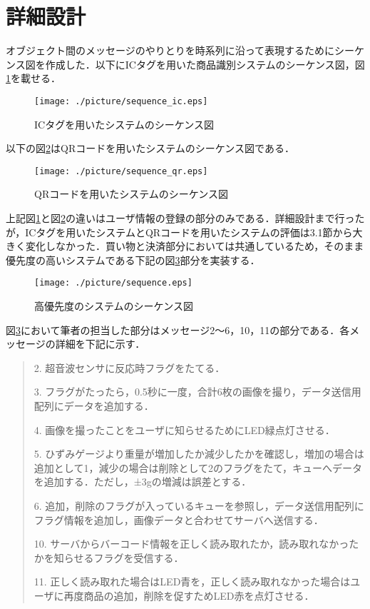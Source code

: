

\section{詳細設計}

オブジェクト間のメッセージのやりとりを時系列に沿って表現するためにシーケンス図を作成した．以下にICタグを用いた商品識別システムのシーケンス図，図\ref{sequence_ic}を載せる．

\begin{figure}[htbp]
\centering
\texttt{[image: ./picture/sequence\_ic.eps]}
\caption{ICタグを用いたシステムのシーケンス図}
\label{sequence_ic}
\end{figure}


以下の図\ref{sequence_qr}はQRコードを用いたシステムのシーケンス図である．


\begin{figure}[htbp]
\centering
\texttt{[image: ./picture/sequence\_qr.eps]}
\caption{QRコードを用いたシステムのシーケンス図}
\label{sequence_qr}
\end{figure}


上記図\ref{sequence_ic}と図\ref{sequence_qr}の違いはユーザ情報の登録の部分のみである．詳細設計まで行ったが，ICタグを用いたシステムとQRコードを用いたシステムの評価は3.1節から大きく変化しなかった．買い物と決済部分においては共通しているため，そのまま優先度の高いシステムである下記の図\ref{sequence}部分を実装する．



\begin{figure}[htbp]
\centering
\texttt{[image: ./picture/sequence.eps]}
\caption{高優先度のシステムのシーケンス図}
\label{sequence}
\end{figure}


図\ref{sequence}において筆者の担当した部分はメッセージ2～6，10，11の部分である．各メッセージの詳細を下記に示す．


\begin{quote}
2. 超音波センサに反応時フラグをたてる．

3. フラグがたったら，0.5秒に一度，合計6枚の画像を撮り，データ送信用配列にデータを追加する．

4. 画像を撮ったことをユーザに知らせるためにLED緑点灯させる．

5. ひずみゲージより重量が増加したか減少したかを確認し，増加の場合は追加として1，減少の場合は削除として2のフラグをたて，キューへデータを追加する．ただし，±3gの増減は誤差とする．

6. 追加，削除のフラグが入っているキューを参照し，データ送信用配列にフラグ情報を追加し，画像データと合わせてサーバへ送信する．

10. サーバからバーコード情報を正しく読み取れたか，読み取れなかったかを知らせるフラグを受信する．

11. 正しく読み取れた場合はLED青を，正しく読み取れなかった場合はユーザに再度商品の追加，削除を促すためLED赤を点灯させる．
\end{quote}


